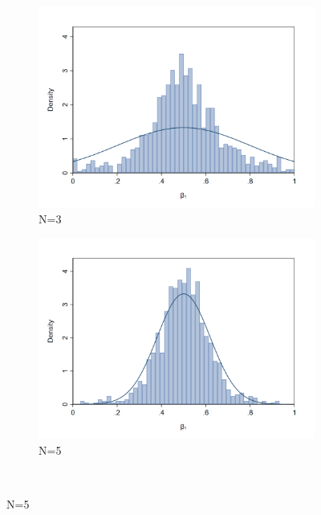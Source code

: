 \documentclass[a4paper,12pt]{article}
\begin{document}
    \begin{figure}[H]
        \begin{subfigure}[c]{0.49\textwidth}
            \centering
            \includegraphics[width=1\columnwidth]{figures/distribution_beta1_3}
            \caption{N=3}
            \label{fig:distribution beta1 N3}
        \end{subfigure}%
        \begin{subfigure}[c]{0.49\columnwidth}
            \centering
            \includegraphics[width=1\columnwidth]{figures/distribution_beta1_5}
            \caption{N=5}
            \label{fig:distribution beta1 N5}								
        \end{subfigure}\\


\end{figure}
\end{document}
